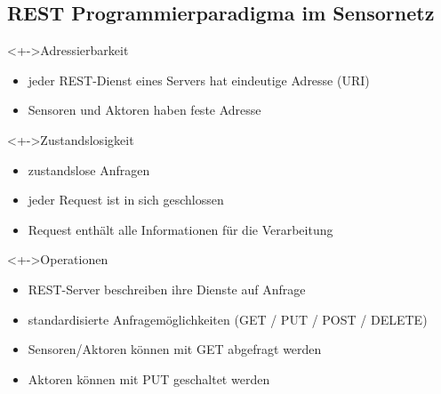 \subsection[REST]{REST Programmierparadigma im Sensornetz}


\begin{frame}{\insertsubsection}{}
		\begin{block}<+->{Adressierbarkeit}
			\begin{itemize}
        		\item jeder REST-Dienst eines Servers hat eindeutige Adresse (URI)
        		\item Sensoren und Aktoren haben feste Adresse %
    			\end{itemize}
		\end{block}
		\begin{block}<+->{Zustandslosigkeit}
    			\begin{itemize}
        		\item zustandslose Anfragen
        		\item jeder Request ist in sich geschlossen
        		\item Request enthält alle Informationen für die Verarbeitung
    			\end{itemize}
		\end{block}
		\begin{block}<+->{Operationen}
    			\begin{itemize}
        		\item REST-Server beschreiben ihre Dienste auf Anfrage
        		\item standardisierte Anfragemöglichkeiten\newline
				(GET / PUT / POST / DELETE)
        		\item Sensoren/Aktoren können mit GET abgefragt werden
        		\item Aktoren können mit PUT geschaltet werden
    			\end{itemize}
		\end{block}
\end{frame}



